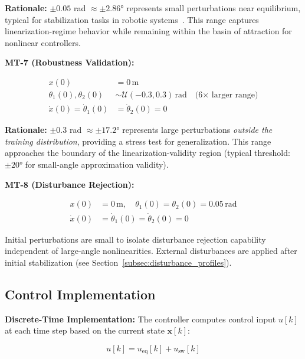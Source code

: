 \textbf{Rationale:} $\pm 0.05$ rad $\approx \pm 2.86°$ represents small perturbations near equilibrium, typical for stabilization tasks in robotic systems~\cite{spong2006robot}. This range captures linearization-regime behavior while remaining within the basin of attraction for nonlinear controllers.

\textbf{MT-7 (Robustness Validation):}

\begin{align}
\label{eq:initial_conditions_robustness}
x(0) &= 0 \, \text{m} \nonumber \\
\theta_1(0), \theta_2(0) &\sim \mathcal{U}(-0.3, 0.3) \, \text{rad} \quad \text{(6× larger range)} \\
\dot{x}(0) = \dot{\theta}_1(0) &= \dot{\theta}_2(0) = 0 \nonumber
\end{align}

\textbf{Rationale:} $\pm 0.3$ rad $\approx \pm 17.2°$ represents large perturbations \textit{outside the training distribution}, providing a stress test for generalization. This range approaches the boundary of the linearization-validity region (typical threshold: $\pm 20°$ for small-angle approximation validity).

\textbf{MT-8 (Disturbance Rejection):}

\begin{align}
\label{eq:initial_conditions_disturbance}
x(0) &= 0 \, \text{m}, \quad \theta_1(0) = \theta_2(0) = 0.05 \, \text{rad} \nonumber \\
\dot{x}(0) &= \dot{\theta}_1(0) = \dot{\theta}_2(0) = 0
\end{align}

Initial perturbations are small to isolate disturbance rejection capability independent of large-angle nonlinearities. External disturbances are applied after initial stabilization (see Section~\ref{subsec:disturbance_profiles}).

\subsection{Control Implementation}
\label{subsec:control_implementation}

\textbf{Discrete-Time Implementation:}
The controller computes control input $u[k]$ at each time step based on the current state $\mathbf{x}[k]$:

\begin{equation}
\label{eq:discrete_control}
u[k] = u_{\text{eq}}[k] + u_{\text{sw}}[k]
\end{equation}

